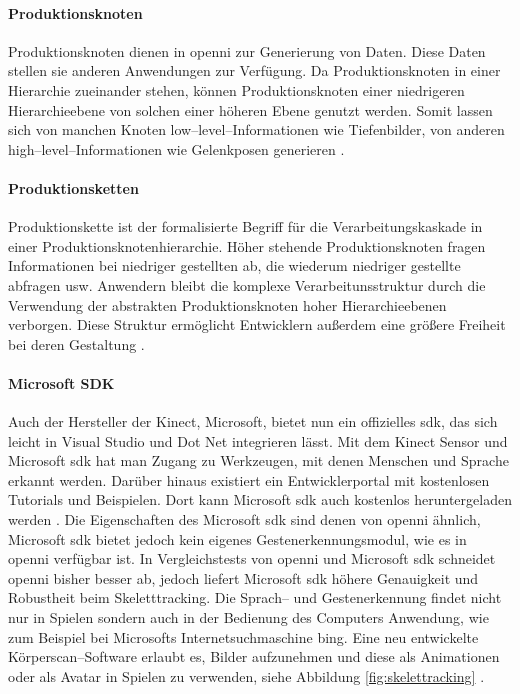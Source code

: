\paragraph{Produktionsknoten}
Produktionsknoten dienen in \gls{openni} zur Generierung von Daten.
Diese Daten stellen sie anderen Anwendungen zur Verfügung.
Da Produktionsknoten in einer Hierarchie zueinander stehen, können Produktionsknoten einer niedrigeren Hierarchieebene von solchen einer höheren Ebene genutzt werden.
Somit lassen sich von manchen Knoten low--level--Informationen wie Tiefenbilder, von anderen high--level--Informationen wie Gelenkposen generieren \cite{kinect_6}.

\paragraph{Produktionsketten}
Produktionskette ist der formalisierte Begriff für die Verarbeitungskaskade in einer Produktionsknotenhierarchie.
Höher stehende Produktionsknoten fragen Informationen bei niedriger gestellten ab, die wiederum niedriger gestellte abfragen usw.
Anwendern bleibt die komplexe Verarbeitunsstruktur durch die Verwendung der abstrakten Produktionsknoten hoher Hierarchieebenen verborgen.
Diese Struktur ermöglicht Entwicklern außerdem eine größere Freiheit bei deren Gestaltung \cite{kinect_6}.

\paragraph{Microsoft SDK}
Auch der Hersteller der Kinect, Microsoft, bietet nun ein offizielles \gls{sdk}, das sich leicht in Visual Studio und Dot Net integrieren lässt.
Mit dem Kinect Sensor und Microsoft \gls{sdk} hat man Zugang zu Werkzeugen, mit denen Menschen und Sprache erkannt werden.
Darüber hinaus existiert ein Entwicklerportal mit kostenlosen Tutorials und Beispielen.
Dort kann Microsoft \gls{sdk} auch kostenlos heruntergeladen werden \cite{kinect_4}.
Die Eigenschaften des Microsoft \gls{sdk} sind denen von \gls{openni} ähnlich, Microsoft \gls{sdk} bietet jedoch kein eigenes Gestenerkennungsmodul, wie es in \gls{openni} verfügbar ist.
In Vergleichstests von \gls{openni} und Microsoft \gls{sdk} schneidet \gls{openni} bisher besser ab, jedoch liefert Microsoft \gls{sdk} höhere Genauigkeit und Robustheit beim Skeletttracking.
Die Sprach-- und Gestenerkennung findet nicht nur in Spielen sondern auch in der Bedienung des Computers Anwendung, wie zum Beispiel bei Microsofts Internetsuchmaschine bing.
Eine neu entwickelte Körperscan--Software erlaubt es, Bilder aufzunehmen und diese als Animationen oder als Avatar in Spielen zu verwenden, siehe Abbildung \ref{fig:skelettracking} \cite{kinect_5}.

